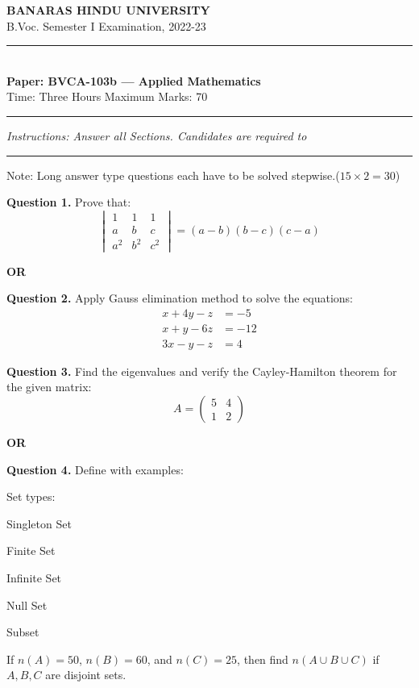 \documentclass[11pt,a4paper]{article}
\begin{document}
\begin{center}
  {\large\bfseries BANARAS HINDU UNIVERSITY}\\[2pt]
  {\normalsize B.Voc. Semester I Examination, 2022-23}\\[6pt]
  \rule{0.8\linewidth}{0.5pt}\\[6pt]
  {\large\bfseries Paper: BVCA-103b --- Applied Mathematics}\\[4pt]
  {\normalsize Time: Three Hours \hfill Maximum Marks: 70}
\end{center}

\rule{\linewidth}{0.4pt}

\smallskip
\noindent\textit{Instructions: Answer all Sections. Candidates are required to}

\bigskip

\bigskip{}
\rule{\linewidth}{0.4pt}\smallskip

Note: Long answer type questions each have to be solved stepwise.\hfill ($15 \times 2 = 30$)

\medskip\noindent\textbf{Question 1.} Prove that:
\[
\begin{vmatrix}
  1 & 1 & 1 \\
  a & b & c \\
  a^2 & b^2 & c^2
\end{vmatrix} = (a-b)(b-c)(c-a)
\]
\centerline{\textbf{OR}}

\medskip\noindent\textbf{Question 2.} Apply Gauss elimination method to solve the equations:
\[
\begin{aligned}
  x + 4y - z &= -5 \\
  x + y - 6z &= -12 \\
  3x - y - z &= 4
\end{aligned}
\]

\medskip\noindent\textbf{Question 3.} Find the eigenvalues and verify the Cayley-Hamilton theorem for the given matrix:
\[
A = \begin{pmatrix}
  5 & 4 \\
  1 & 2
\end{pmatrix}
\]
\centerline{\textbf{OR}}

\medskip\noindent\textbf{Question 4.} Define with examples:
\begin{parts}
  \item Set types:
  \begin{parts}
    \item Singleton Set
    \item Finite Set
    \item Infinite Set
    \item Null Set
    \item Subset
  \end{parts}
  \item If $n(A) = 50$, $n(B) = 60$, and $n(C) = 25$, then find $n(A \cup B \cup C)$ if $A, B, C$ are disjoint sets.
\end{parts}
\end{document}
